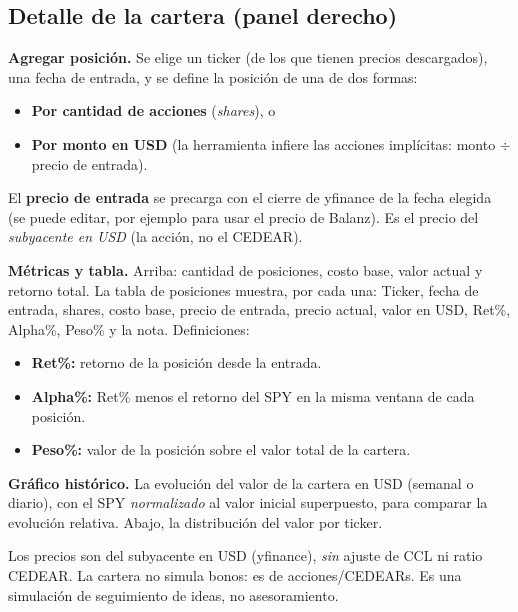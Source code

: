 \documentclass[11pt,a4paper]{article}
\begin{document}
\subsection{Detalle de la cartera (panel derecho)}

\textbf{Agregar posici\'on.} Se elige un ticker (de los que tienen precios
descargados), una fecha de entrada, y se define la posici\'on de una de dos formas:

\begin{itemize}[leftmargin=1.4em]
  \item \textbf{Por cantidad de acciones} (\emph{shares}), o
  \item \textbf{Por monto en USD} (la herramienta infiere las acciones impl\'icitas:
  monto $\div$ precio de entrada).
\end{itemize}

El \textbf{precio de entrada} se precarga con el cierre de yfinance de la fecha
elegida (se puede editar, por ejemplo para usar el precio de Balanz). Es el precio del
\emph{subyacente en USD} (la acci\'on, no el CEDEAR).

\textbf{M\'etricas y tabla.} Arriba: cantidad de posiciones, costo base, valor actual y
retorno total. La tabla de posiciones muestra, por cada una: Ticker, fecha de entrada,
shares, costo base, precio de entrada, precio actual, valor en USD, Ret\%, Alpha\%,
Peso\% y la nota. Definiciones:

\begin{itemize}[leftmargin=1.4em]
  \item \textbf{Ret\%:} retorno de la posici\'on desde la entrada.
  \item \textbf{Alpha\%:} Ret\% menos el retorno del SPY en la misma ventana de cada
  posici\'on.
  \item \textbf{Peso\%:} valor de la posici\'on sobre el valor total de la cartera.
\end{itemize}

\textbf{Gr\'afico hist\'orico.} La evoluci\'on del valor de la cartera en USD (semanal
o diario), con el SPY \emph{normalizado} al valor inicial superpuesto, para comparar
la evoluci\'on relativa. Abajo, la distribuci\'on del valor por ticker.

\begin{nota}
Los precios son del subyacente en USD (yfinance), \emph{sin} ajuste de CCL ni ratio
CEDEAR. La cartera no simula bonos: es de acciones/CEDEARs. Es una simulaci\'on de
seguimiento de ideas, no asesoramiento.
\end{nota}
\end{document}
